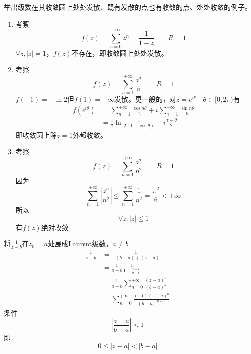\begin{homeworkProblem}
举出级数在其收敛圆上处处发散、既有发散的点也有收敛的点、处处收敛的例子。\newline
\solution
\begin{enumerate}
    \item 考察
    \[f(z) = \sum_{n=0}^{+\infty}z^n = \frac{1}{1-z}\qquad R=1\]
    $\forall z, |z|=1$，$f(z)$不存在，即收敛圆上处处发散。
    \item 考察
    \[f(z) = \sum_{n=1}^{+\infty}\frac{z^n}{n} \qquad R=1\]
    $f(-1)=-\ln2$但$f(1)=+\infty$发散。更一般的，对$z=e^{i\theta}\quad\theta\in[0,2\pi)$有
    \[\begin{split}
    f(e^{i\theta}) &= \sum_{n=1}^{+\infty}\frac{\cos n\theta}{n}+i\sum_{n=1}^{+\infty}\frac{\sin n\theta}{n} \\
    &= \frac{1}{2}\ln\frac{1}{2(1-\cos\theta)}+i\frac{\pi-\theta}{2}
    \end{split}
    \]
    即收敛圆上除$z=1$外都收敛。
    \item 考察
    \[
    f(z) = \sum_{n=1}^{+\infty}\frac{z^n}{n^2}\qquad R=1
    \]
    因为
    \[
    \sum_{n=1}^{+\infty}\left|\frac{z^n}{n^2}\right| \leq \sum_{n=1}^{+\infty} \frac{1}{n^2} = \frac{\pi^2}{6} < +\infty
    \]
    所以
    \[\forall z:|z|\leq1\]有$f(z)$绝对收敛
\end{enumerate}
\end{homeworkProblem}
\begin{homeworkProblem}
    将$\frac{1}{z-b}$在$z_0=a$处展成Laurent级数，$a\neq b$\\
\solution
\[\begin{split}
\frac{1}{z-b}
&= \frac{1}{-(b-a) + (z-a)}\\
&= \frac{1}{a-b}\frac{1}{1-\frac{z-a}{b-a}} \\
&= \frac{1}{a-b}\sum_{n=0}^{+\infty}\frac{(z-a)^n}{(b-a)^n}\\
&= \sum_{n=0}^{+\infty}\frac{(-1)(z-a)^n}{(b-a)^{n+1}}
\end{split}\]
条件
\[
|\frac{z-a}{b-a}| < 1
\]
即\[0\leq|z-a|<|b-a|\]
\end{homeworkProblem}
